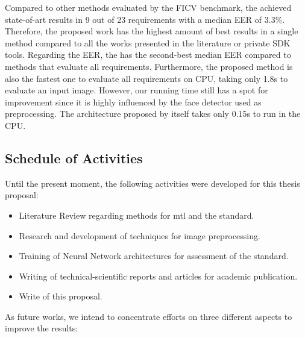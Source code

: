 Compared to other methods evaluated by the FICV benchmark, the \methodname achieved state-of-art results in 9 out of 23 requirements with a median EER of 3.3\%. Therefore, the proposed work has the highest amount of best results in a single method compared to all the works presented in the literature or private SDK tools. Regarding the EER, the \methodname has the second-best median EER compared to methods that evaluate all requirements. Furthermore, the proposed method is also the fastest one to evaluate all requirements on CPU, taking only 1.8s to evaluate an input image. However, our running time still has a spot for improvement since it is highly influenced by the face detector used as preprocessing. The architecture proposed by itself takes only 0.15s to run in the CPU.

\subsection{Schedule of Activities}

Until the present moment, the following activities were developed for this thesis proposal:

\begin{itemize}
\item Literature Review regarding methods for \acl{mtl} and the \icao standard.
\item Research and development of techniques for image preprocessing.
\item Training of Neural Network architectures for assessment of the \icao standard.
\item Writing of technical-scientific reports and articles for academic publication.
\item Write of this proposal.
\end{itemize}

As future works, we intend to concentrate efforts on three different aspects to improve the results:


